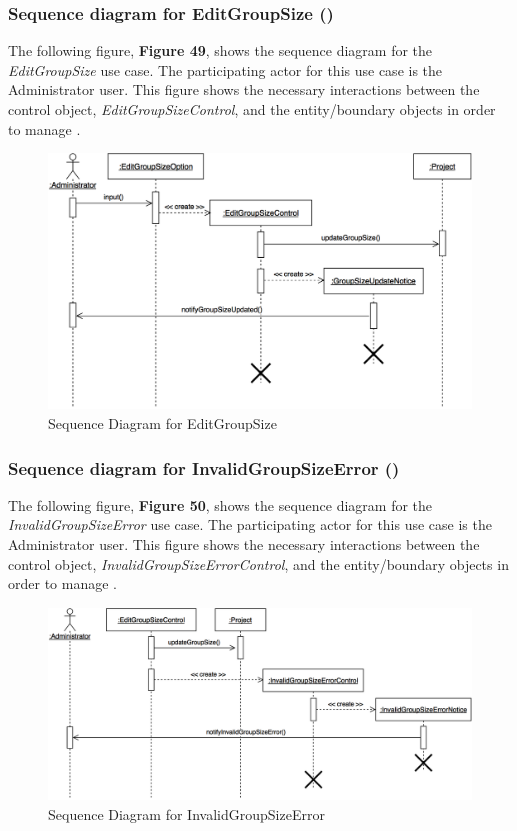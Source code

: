 \documentclass[12pt,letterpaper]{article}
\begin{document}
\subsubsection*{Sequence diagram for EditGroupSize (\editgroupsize{})}

The following figure, {\bf Figure 49}, shows the sequence diagram for the {\it EditGroupSize} use case. The participating actor for this use case is
the Administrator user. This figure shows the necessary interactions between the control object, {\it EditGroupSizeControl}, and the
entity/boundary objects in order to manage \editgroupsize{}.

\begin{figure}[H]
	\centering{}
	\includegraphics[scale=0.3]{imgs/seq/edit-group-size.png}
	\caption{Sequence Diagram for EditGroupSize}
\end{figure}

\subsubsection*{Sequence diagram for InvalidGroupSizeError (\invalidgroupsizeerror{})}

The following figure, {\bf Figure 50}, shows the sequence diagram for the {\it InvalidGroupSizeError} use case. The participating actor for this use case is
the Administrator user. This figure shows the necessary interactions between the control object, {\it InvalidGroupSizeErrorControl}, and the
entity/boundary objects in order to manage \invalidgroupsizeerror{}.

\begin{figure}[H]
	\centering{}
	\includegraphics[scale=0.3]{imgs/seq/invalid-group-size-error.png}
	\caption{Sequence Diagram for InvalidGroupSizeError}
\end{figure}
\end{document}
